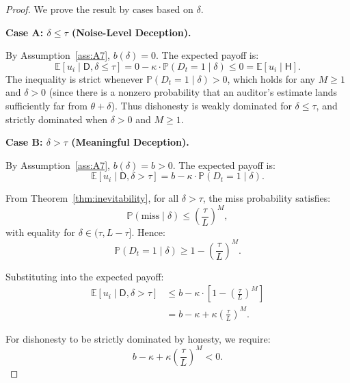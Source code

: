 \documentclass[11pt,a4paper]{article}
\theoremstyle{definition}
\theoremstyle{remark}
\newcommand{\E}{\mathbb{E}}
\newcommand{\Pbb}{\mathbb{P}}
\newcommand{\honest}{\mathsf{H}}
\newcommand{\dishonest}{\mathsf{D}}
\newcommand{\truth}{\theta}
\newcommand{\deception}{\delta}
\newcommand{\threshold}{\tau}
\newcommand{\tol}{L}
\newcommand{\benefit}{b}
\newcommand{\cost}{\kappa}
\begin{document}
\begin{proof}
We prove the result by cases based on $\deception$.

\medskip
\noindent\textbf{Case A: $\deception \leq \threshold$ (Noise-Level Deception).}

By Assumption~\ref{ass:A7}, $\benefit(\deception) = 0$. The expected payoff is:
\begin{equation}
    \E[u_i \mid \dishonest, \deception \leq \threshold]
    = 0 - \cost \cdot \Pbb(D_t = 1 \mid \deception)
    \leq 0 = \E[u_i \mid \honest].
\end{equation}
The inequality is strict whenever $\Pbb(D_t = 1 \mid \deception) > 0$, which holds for any $M \geq 1$ and $\deception > 0$ (since there is a nonzero probability that an auditor's estimate lands sufficiently far from $\truth + \deception$). Thus dishonesty is weakly dominated for $\deception \leq \threshold$, and strictly dominated when $\deception > 0$ and $M \geq 1$.

\medskip
\noindent\textbf{Case B: $\deception > \threshold$ (Meaningful Deception).}

By Assumption~\ref{ass:A7}, $\benefit(\deception) = b > 0$. The expected payoff is:
\begin{equation}
    \E[u_i \mid \dishonest, \deception > \threshold]
    = b - \cost \cdot \Pbb(D_t = 1 \mid \deception).
\end{equation}

From Theorem~\ref{thm:inevitability}, for all $\deception > \threshold$, the miss probability satisfies:
\begin{equation}
    \Pbb(\text{miss} \mid \deception) \leq \left(\frac{\threshold}{\tol}\right)^M,
\end{equation}
with equality for $\deception \in (\threshold, \tol - \threshold]$. Hence:
\begin{equation}
    \Pbb(D_t = 1 \mid \deception) \geq 1 - \left(\frac{\threshold}{\tol}\right)^M.
\end{equation}

Substituting into the expected payoff:
\begin{align}
    \E[u_i \mid \dishonest, \deception > \threshold]
    &\leq b - \cost \cdot \left[1 - \left(\frac{\threshold}{\tol}\right)^M\right] \\
    &= b - \cost + \cost \left(\frac{\threshold}{\tol}\right)^M.
    \label{eq:expected_bound}
\end{align}

For dishonesty to be strictly dominated by honesty, we require:
\begin{equation}
    b - \cost + \cost \left(\frac{\threshold}{\tol}\right)^M < 0.
\end{equation}


\end{proof}
\end{document}
